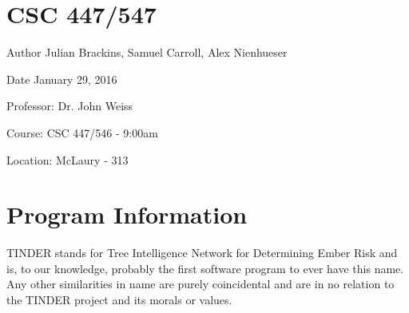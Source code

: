 \hypertarget{index_course_section}{}\section{C\-S\-C 447/547}\label{index_course_section}
\begin{DoxyAuthor}{Author}
Julian Brackins, Samuel Carroll, Alex Nienhueser
\end{DoxyAuthor}
\begin{DoxyDate}{Date}
January 29, 2016
\end{DoxyDate}
\begin{DoxyParagraph}{Professor\-:}
Dr. John Weiss
\end{DoxyParagraph}
\begin{DoxyParagraph}{Course\-:}
C\-S\-C 447/546 -\/ 9\-:00am
\end{DoxyParagraph}
\begin{DoxyParagraph}{Location\-:}
Mc\-Laury -\/ 313
\end{DoxyParagraph}
\hypertarget{index_program_section}{}\section{Program Information}\label{index_program_section}
T\-I\-N\-D\-E\-R stands for Tree Intelligence Network for Determining Ember Risk and is, to our knowledge, probably the first software program to ever have this name. Any other similarities in name are purely coincidental and are in no relation to the T\-I\-N\-D\-E\-R project and its morals or values.

